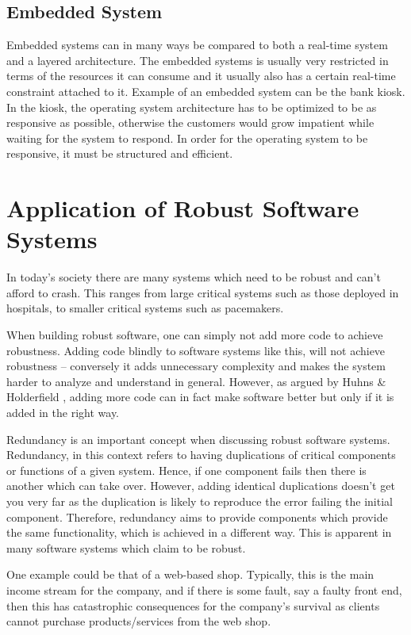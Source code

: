   \subsection{Embedded System}
    Embedded systems can in many ways be compared to both a real-time system and a layered architecture. The embedded systems is usually very restricted in terms of the resources it can consume and it usually also has a certain real-time constraint attached to it. Example of an  embedded system can be the bank kiosk. In the kiosk, the operating system architecture has to be optimized to be as responsive as possible, otherwise the customers would grow impatient while waiting for the system to respond. In order for the operating system to be responsive, it must be structured and efficient. 

\section{Application of Robust Software Systems}
  In today's society there are many systems which need to be robust and can't afford to crash. This ranges from large critical systems such as those deployed in hospitals, to smaller critical systems such as pacemakers.

  When building robust software, one can simply not add more code to achieve robustness.  Adding code blindly to software systems like this, will not achieve robustness – conversely it adds unnecessary complexity and makes the system harder to analyze and understand in general. However, as argued by Huhns \& Holderfield \cite{huhns2002robust}, adding more code can in fact make software better but only if it is added in the right way.

  Redundancy is an important concept when discussing robust software systems. Redundancy, in this context refers to having duplications of critical components or functions of a given system. Hence, if one component fails then there is another which can take over. However, adding identical duplications doesn't get you very far as the duplication is likely to reproduce the error failing the initial component. Therefore, redundancy aims to provide components which provide the same functionality, which is achieved in a different way.  This is apparent in many software systems which claim to be robust.

  One example could be that of a web-based shop. Typically, this is the main income stream for the company, and if there is some fault, say a faulty front end, then this has catastrophic consequences for the company's survival as clients cannot purchase products/services from the web shop.

